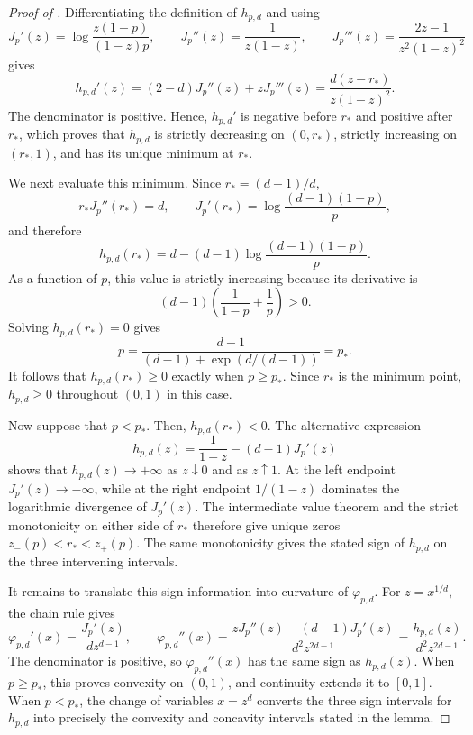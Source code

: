 \begin{proof}[Proof of ]
Differentiating the definition of $h_{p,d}$ and using
\[
  J_p'(z)=\log\frac{z(1-p)}{(1-z)p},
  \qquad
  J_p''(z)=\frac1{z(1-z)},
  \qquad
  J_p'''(z)=\frac{2z-1}{z^2(1-z)^2}
\]
gives
\[
  h_{p,d}'(z)=(2-d)J_p''(z)+zJ_p'''(z)
  =\frac{d(z-r_*)}{z(1-z)^2}.
\]
The denominator is positive.  Hence, $h_{p,d}'$ is negative before $r_*$ and
positive after $r_*$, which proves that $h_{p,d}$ is strictly decreasing on
$(0,r_*)$, strictly increasing on $(r_*,1)$, and has its unique minimum at
$r_*$.

We next evaluate this minimum.  Since $r_*=(d-1)/d$,
\[
  r_*J_p''(r_*)=d,
  \qquad
  J_p'(r_*)=\log\frac{(d-1)(1-p)}{p},
\]
and therefore
\[
  h_{p,d}(r_*)
  =d-(d-1)\log\frac{(d-1)(1-p)}{p}.
\]
As a function of $p$, this value is strictly increasing because its derivative
is
\[
  (d-1)\left(\frac1{1-p}+\frac1p\right)>0.
\]
Solving $h_{p,d}(r_*)=0$ gives
\[
  p=\frac{d-1}{(d-1)+\exp(d/(d-1))}=p_*.
\]
It follows that $h_{p,d}(r_*)\ge0$ exactly when $p\ge p_*$.  Since $r_*$ is
the minimum point, $h_{p,d}\ge0$ throughout $(0,1)$ in this case.

Now suppose that $p<p_*$.  Then, $h_{p,d}(r_*)<0$.  The alternative expression
\[
  h_{p,d}(z)=\frac1{1-z}-(d-1)J_p'(z)
\]
shows that $h_{p,d}(z)\to+\infty$ as $z\downarrow0$ and as $z\uparrow1$.
At the left endpoint $J_p'(z)\to-\infty$, while at the right endpoint
$1/(1-z)$ dominates the logarithmic divergence of $J_p'(z)$.  The intermediate
value theorem and the strict monotonicity on either side of $r_*$ therefore
give unique zeros $z_-(p)<r_*<z_+(p)$.  The same monotonicity gives the stated
sign of $h_{p,d}$ on the three intervening intervals.

It remains to translate this sign information into curvature of
$\varphi_{p,d}$.  For $z=x^{1/d}$, the chain rule gives
\[
  \varphi_{p,d}'(x)=\frac{J_p'(z)}{d z^{d-1}},
  \qquad
  \varphi_{p,d}''(x)
  =\frac{zJ_p''(z)-(d-1)J_p'(z)}{d^2z^{2d-1}}
  =\frac{h_{p,d}(z)}{d^2z^{2d-1}}.
\]
The denominator is positive, so $\varphi_{p,d}''(x)$ has the same sign as
$h_{p,d}(z)$.  When $p\ge p_*$, this proves convexity on $(0,1)$, and
continuity extends it to $[0,1]$.  When $p<p_*$, the change of variables
$x=z^d$ converts the three sign intervals for $h_{p,d}$ into precisely the
convexity and concavity intervals stated in the lemma.
\end{proof}

